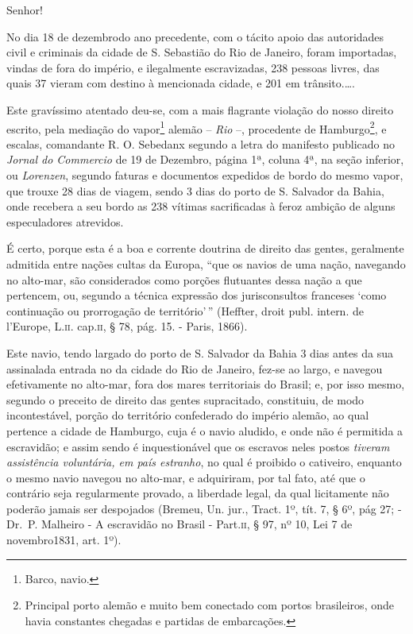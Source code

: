 Senhor!

No dia 18 de dezembrodo ano precedente, com o tácito apoio das
autoridades civil e criminais da cidade de S. Sebastião do Rio de
Janeiro, foram importadas, vindas de fora do império, e ilegalmente
escravizadas, 238 pessoas livres, das quais 37 vieram com destino à
mencionada cidade, e 201 em trânsito.\ldots.

Este gravíssimo atentado deu-se, com a mais flagrante violação do nosso
direito escrito, pela mediação do vapor\footnote{ Barco, navio.} alemão
-- \emph{Rio} --, procedente de Hamburgo\footnote{ Principal porto
  alemão e muito bem conectado com portos brasileiros, onde havia
  constantes chegadas e partidas de embarcações.}, e escalas, comandante
R. O. Sebedanx segundo a letra do manifesto publicado no \emph{Jornal do
Commercio} de 19 de Dezembro, página 1ª, coluna 4ª, na seção inferior,
ou \emph{Lorenzen}, segundo faturas e documentos expedidos de bordo do
mesmo vapor, que trouxe 28 dias de viagem, sendo 3 dias do porto de S.
Salvador da Bahia, onde recebera a seu bordo as 238 vítimas sacrificadas
à feroz ambição de alguns especuladores atrevidos.

É certo, porque esta é a boa e corrente doutrina de direito das gentes,
geralmente admitida entre nações cultas da Europa, ``que os navios de uma
nação, navegando no alto-mar, são considerados como porções flutuantes
dessa nação a que pertencem, ou, segundo a técnica expressão dos
jurisconsultos franceses `como continuação ou prorrogação de
território'\,'' (Heffter, droit publ. intern. de l'Europe, L.\textsc{ii}. cap.\textsc{ii},
§ 78, pág. 15. - Paris, 1866).

Este navio, tendo largado do porto de S. Salvador da Bahia 3 dias antes
da sua assinalada entrada no da cidade do Rio de Janeiro, fez-se ao
largo, e navegou efetivamente no alto-mar, fora dos mares territoriais
do Brasil; e, por isso mesmo, segundo o preceito de direito das gentes
supracitado, constituiu, de modo incontestável, porção do território
confederado do império alemão, ao qual pertence a cidade de Hamburgo,
cuja é o navio aludido, e onde não é permitida a escravidão; e assim
sendo é inquestionável que os escravos neles postos \emph{tiveram
assistência voluntária, em país estranho}, no qual é proibido o
cativeiro, enquanto o mesmo navio navegou no alto-mar, e adquiriram, por
tal fato, até que o contrário seja regularmente provado, a liberdade
legal, da qual licitamente não poderão jamais ser despojados (Bremeu,
Un. jur., Tract. 1º, tít. 7, § 6º, pág 27; - Dr.~P. Malheiro - A
escravidão no Brasil - Part.\textsc{ii}, § 97, nº 10, Lei 7 de novembro1831,
art. 1º).

